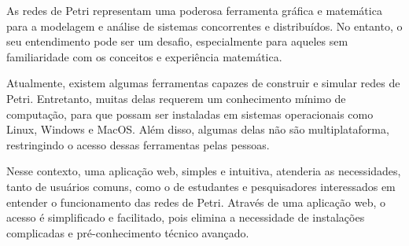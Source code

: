 \documentclass[
	12pt,				%
	openright,			%
	oneside,			%
	a4paper,			%
	english,			%
	brazil				%
	]{abntex2}
\begin{document}
As redes de Petri representam uma poderosa ferramenta gráfica e matemática para a modelagem e análise de sistemas concorrentes e distribuídos. No entanto, o seu entendimento pode ser um desafio, especialmente para aqueles sem familiaridade com os conceitos e experiência matemática.

Atualmente, existem algumas ferramentas capazes de construir e simular redes de Petri. Entretanto, muitas delas requerem um conhecimento mínimo de computação, para que possam ser instaladas em sistemas operacionais como Linux, Windows e MacOS. Além disso, algumas delas não são multiplataforma, restringindo o acesso dessas ferramentas pelas pessoas.

Nesse contexto, uma aplicação web, simples e intuitiva, atenderia as necessidades, tanto de usuários comuns, como o de estudantes e pesquisadores interessados em entender o funcionamento das redes de Petri. Através de uma aplicação web, o acesso é simplificado e facilitado, pois elimina a necessidade de instalações complicadas e pré-conhecimento técnico avançado.









\end{document}
